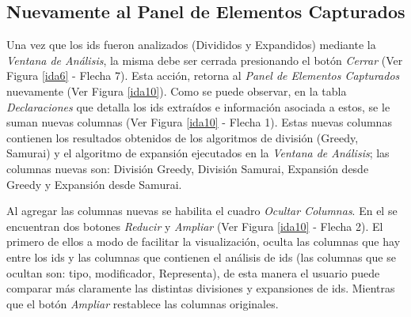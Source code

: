 \subsection{Nuevamente al Panel de Elementos Capturados}

Una vez que los ids fueron analizados (Divididos y Expandidos) mediante la \textit{Ventana de Análisis}, la misma debe ser cerrada presionando el botón \textit{Cerrar} (Ver Figura \ref{ida6} - Flecha 7). Esta acción, retorna al \textit{Panel de Elementos Capturados} nuevamente (Ver Figura \ref{ida10}).
Como se puede observar, en la tabla \textit{Declaraciones} que detalla los ids extraídos e información asociada a estos, se le suman nuevas columnas (Ver Figura \ref{ida10} - Flecha 1). Estas nuevas columnas contienen los resultados obtenidos de los algoritmos de división (Greedy, Samurai) y el algoritmo de expansión ejecutados en la \textit{Ventana de Análisis}; las columnas nuevas son: División Greedy, División Samurai, Expansión desde Greedy y Expansión desde Samurai.

Al agregar las columnas nuevas se habilita el cuadro \textit{Ocultar Columnas}. En el se encuentran dos botones \textit{Reducir} y \textit{Ampliar} (Ver Figura \ref{ida10} - Flecha 2). El primero de ellos a modo de facilitar la visualización, oculta las columnas que hay entre los ids y las columnas que contienen el análisis de ids (las columnas que se ocultan son: tipo, modificador, Representa), de esta manera el usuario puede comparar más claramente las distintas divisiones y expansiones de ids. Mientras que el botón \textit{Ampliar} restablece las columnas originales.



